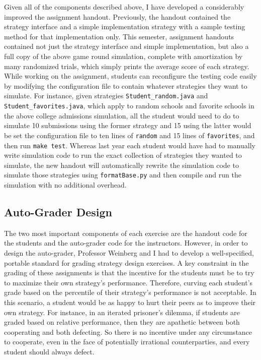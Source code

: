 \documentclass[pageno]{jpaper}
\begin{document}
Given all of the components described above, I have developed a considerably improved the assignment handout.
Previously, the handout contained the strategy interface and a simple implementation strategy with a sample testing method for that implementation only.
This semester, assignment handouts contained not just the strategy interface and simple implementation, but also a full copy of the above game round simulation, complete with amortization by many randomized trials, which simply prints the average score of each strategy.
While working on the assignment, students can reconfigure the testing code easily by modifying the configuration file to contain whatever strategies they want to simulate.
For instance, given strategies \texttt{Student\_random.java} and \texttt{Student\_favorites.java}, which apply to random schools and favorite schools in the above college admissions simulation, all the student would need to do to simulate 10 submissions using the former strategy and 15 using the latter would be set the configuration file to ten lines of \texttt{random} and 15 lines of \texttt{favorites}, and then run \texttt{make test}.
Whereas last year each student would have had to manually write simulation code to run the exact collection of strategies they wanted to simulate, the new handout will automatically rewrite the simulation code to simulate those strategies using \texttt{formatBase.py} and then compile and run the simulation with no additional overhead.

\subsection*{Auto-Grader Design}
The two most important components of each exercise are the handout code for the students and the auto-grader code for the instructors.
However, in order to design the auto-grader, Professor Weinberg and I had to develop a well-specified, portable standard for grading strategy design exercises.
A key constraint in the grading of these assignments is that the incentive for the students must be to try to maximize their own strategy's performance.
Therefore, curving each student's grade based on the percentile of their strategy's performance is not acceptable.
In this scenario, a student would be as happy to hurt their peers as to improve their own strategy.
For instance, in an iterated prisoner's dilemma, if students are graded based on relative performance, then they are apathetic between both cooperating and both defecting.
So there is no incentive under any circumstance to cooperate, even in the face of potentially irrational counterparties, and every student should always defect.
\end{document}
